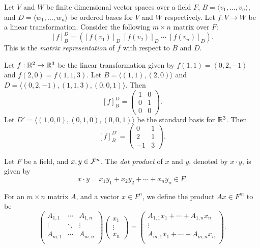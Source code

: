 \begin{defn}
    Let $V$ and $W$ be finite dimensional vector spaces over a field $F$, $B = \langle v_1, \ldots, v_n\rangle$, and $D = \langle w_1, \ldots, w_n\rangle$ be ordered bases for $V$ and $W$ respectively. Let $f: V \to W$ be a linear transformation. Consider the following $m \times n$ matrix over $F$:
    \[[f]_B^D = \left([f(v_1)]_D \; [f(v_2)]_D \;\cdots\; [f(v_n)]_D \right).\]
    This is the \emph{matrix representation} of $f$ with respect to $B$ and $D$.
\end{defn}

\begin{exmp}
    Let $f: \mathbb{R}^2 \to \mathbb{R}^3$ be the linear transformation given by $f(1, 1) = (0, 2, -1)$ and $f(2, 0) = f(1, 1, 3)$. Let $B = \langle (1, 1), (2, 0) \rangle$ and $D = \langle (0, 2, -1), (1, 1, 3), (0, 0, 1)\rangle$. Then
    \[[f]_B^D = \begin{pmatrix}
        1 & 0 \\ 0 & 1 \\ 0 & 0
    \end{pmatrix}.\] Let $D' = \langle (1, 0, 0), (0, 1, 0), (0, 0, 1)\rangle$ be the standard basis for $\mathbb{R}^3$. Then
    \[[f]_B^{D'} = \begin{pmatrix}
        0 & 1 \\ 2 & 1 \\ -1 & 3
    \end{pmatrix}.\]
\end{exmp}

\begin{defn}
    Let $F$ be a field, and $x, y \in \mathcal{F}^n$. The \emph{dot product} of $x$ and $y$, denoted by $x \cdot y$, is given by
    \[x \cdot y = x_1y_1 + x_2y_2 + \cdots + x_ny_n \in F.\]
\end{defn}

For an $m \times n$ matrix $A$, and a vector $x \in F^n$, we define the product $Ax \in F^m$ to be
\[\begin{pmatrix}
    A_{1,1} & \cdots & A_{1, n} \\
    \vdots & \ddots & \vdots \\
    A_{m,1} & \cdots & A_{m, n} \\
\end{pmatrix}\begin{pmatrix}
    x_1 \\ \vdots \\ x_n
\end{pmatrix} = \begin{pmatrix}
    A_{1,1}x_1 + \cdots + A_{1, n}x_n \\
    \vdots \\
    A_{m,1}x_1 + \cdots + A_{m, n}x_n \\
\end{pmatrix}.\]

